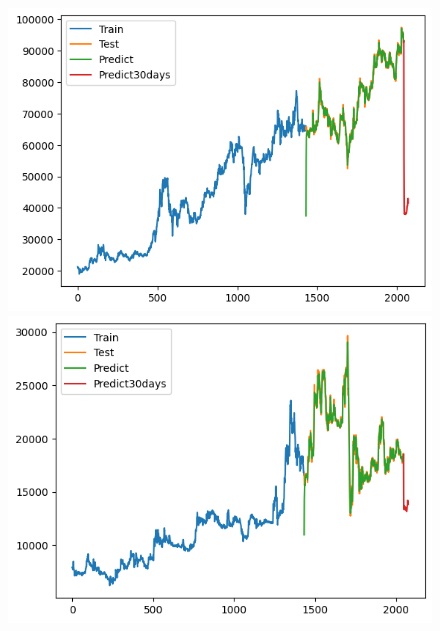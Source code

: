 \begin{figure}[H]
\begin{minipage}{0.15\textwidth}
    \end{minipage}
    \hfill
        \begin{minipage}{0.15\textwidth}
    \centering
    \includegraphics[width=1\textwidth]{resources/chapter-5/result/KF_VCB_7_3.png}
    \end{minipage}
    \hfill
    \begin{minipage}{0.15\textwidth}
    \centering
    \includegraphics[width=1\textwidth]{resources/chapter-5/result/KF_EXIM_7_3.png}
    \end{minipage}
    \hfill
    \begin{minipage}{0.15\textwidth}
    \centering

\end{minipage}
\end{figure}
